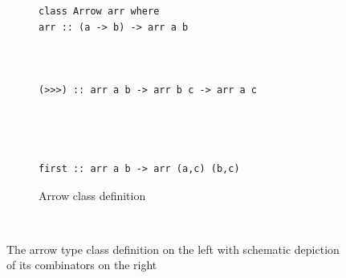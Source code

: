\begin{figure}[h]
\begin{subfigure}{0.5\textwidth}
\begin{lstlisting}[frame=htrbl]
class Arrow arr where
arr :: (a -> b) -> arr a b



(>>>) :: arr a b -> arr b c -> arr a c




first :: arr a b -> arr (a,c) (b,c)
\end{lstlisting}
\caption{Arrow class definition}
\end{subfigure}
~~~~
\begin{subfigure}{0.45\textwidth}
	\begin{center}
	\end{center}
\end{subfigure}
\caption{The arrow type class definition on the left with schematic depiction of its combinators on the right}
\end{figure}

